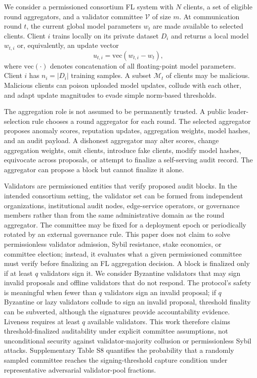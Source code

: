\documentclass[preprint,12pt]{elsarticle}
\begin{document}
We consider a permissioned consortium FL system with $N$ clients, a set of eligible round aggregators, and a validator committee $\mathcal{V}$ of size $m$. At communication round $t$, the current global model parameters $w_t$ are made available to selected clients. Client $i$ trains locally on its private dataset $D_i$ and returns a local model $w_{t,i}$ or, equivalently, an update vector
\begin{equation}
u_{t,i}=\mathrm{vec}(w_{t,i}-w_t),
\end{equation}
where $\mathrm{vec}(\cdot)$ denotes concatenation of all floating-point model parameters. Client $i$ has $n_i=|D_i|$ training samples. A subset $\mathcal{M}_t$ of clients may be malicious. Malicious clients can poison uploaded model updates, collude with each other, and adapt update magnitudes to evade simple norm-based thresholds.

The aggregation role is not assumed to be permanently trusted. A public leader-selection rule chooses a round aggregator for each round. The selected aggregator proposes anomaly scores, reputation updates, aggregation weights, model hashes, and an audit payload. A dishonest aggregator may alter scores, change aggregation weights, omit clients, introduce fake clients, modify model hashes, equivocate across proposals, or attempt to finalize a self-serving audit record. The aggregator can propose a block but cannot finalize it alone.

Validators are permissioned entities that verify proposed audit blocks. In the intended consortium setting, the validator set can be formed from independent organizations, institutional audit nodes, edge-service operators, or governance members rather than from the same administrative domain as the round aggregator. The committee may be fixed for a deployment epoch or periodically rotated by an external governance rule. This paper does not claim to solve permissionless validator admission, Sybil resistance, stake economics, or committee election; instead, it evaluates what a given permissioned committee must verify before finalizing an FL aggregation decision. A block is finalized only if at least $q$ validators sign it. We consider Byzantine validators that may sign invalid proposals and offline validators that do not respond. The protocol's safety is meaningful when fewer than $q$ validators sign an invalid proposal; if $q$ Byzantine or lazy validators collude to sign an invalid proposal, threshold finality can be subverted, although the signatures provide accountability evidence. Liveness requires at least $q$ available validators. This work therefore claims threshold-finalized auditability under explicit committee assumptions, not unconditional security against validator-majority collusion or permissionless Sybil attacks. Supplementary Table S8 quantifies the probability that a randomly sampled committee reaches the signing-threshold capture condition under representative adversarial validator-pool fractions.
\end{document}
